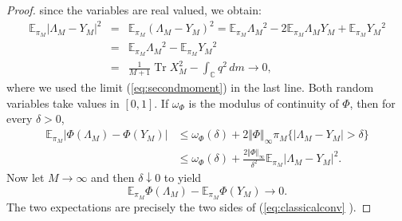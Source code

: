 \documentclass[10pt,a4paper]{amsart}
\newcommand{\func}[1]{\operatorname{#1}}
\begin{document}
\begin{proof}
since the variables are real valued, we obtain:%
\begin{eqnarray*}
\mathbb{E}_{\pi _{M}}|\Lambda _{M}-Y_{M}|^{2} &=&\mathbb{E}_{\pi _{M}}\left(
\Lambda _{M}-Y_{M}\right) ^{2}=\mathbb{E}_{\pi _{M}}\Lambda _{M}{}^{2}-2%
\mathbb{E}_{\pi _{M}}\Lambda _{M}Y_{M}+\mathbb{E}_{\pi _{M}}Y_{M}{}^{2} \\
&=&\mathbb{E}_{\pi _{M}}\Lambda _{M}{}^{2}-\mathbb{E}_{\pi _{M}}Y_{M}{}^{2}
\\
&=&\frac{1}{M+1}\func{Tr}X_{M}^{2}-\int_{\mathbb{C}}q^{2}\,dm\longrightarrow
0\text{,}
\end{eqnarray*}%
where we used the limit (\ref{eq:secondmoment}) in the last line. Both
random variables take values in $[0,1]$. If $\omega _{\Phi }$ is the modulus
of continuity of $\Phi $, then for every $\delta >0$, 
\begin{align*}
\mathbb{E}_{\pi _{M}}|\Phi (\Lambda _{M})-\Phi (Y_{M})|& \leq \omega _{\Phi
}(\delta )+2\Vert \Phi \Vert _{\infty }\pi _{M}\{|\Lambda _{M}-Y_{M}|>\delta
\} \\
& \leq \omega _{\Phi }(\delta )+\frac{2\Vert \Phi \Vert _{\infty }}{\delta
^{2}}\mathbb{E}_{\pi _{M}}|\Lambda _{M}-Y_{M}|^{2}.
\end{align*}%
Now let $M\rightarrow \infty $ and then $\delta \downarrow 0$ to yield 
\begin{equation*}
\mathbb{E}_{\pi _{M}}\Phi (\Lambda _{M})-\mathbb{E}_{\pi _{M}}\Phi
(Y_{M})\longrightarrow 0.
\end{equation*}%
The two expectations are precisely the two sides of (\ref{eq:classicalconv}%
). 
\end{proof}
\end{document}
